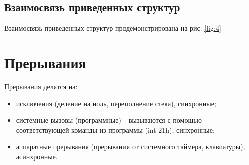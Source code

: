 \subsection{Взаимосвязь приведенных структур}

Взаимосвязь приведенных структур продемонстрирована на рис. \ref{fig:4}

\begin{figure}[ht!]
\end{figure}

\section{Прерывания}

Прерывания делятся на:

\begin{itemize}
	\item исключения (деление на ноль, переполнение стека), синхронные;
	\item системные вызовы (программные) - вызываются с помощью соответствующей команды из программы (int 21h), синхронные;
	\item аппаратные прерывания (прерывания от системного таймера, клавиатуры), асинхронные. 
\end{itemize}

